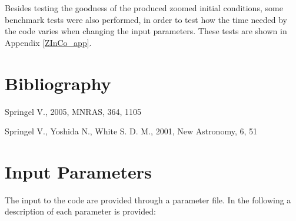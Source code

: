\documentclass[11pt,a4paper,titlepage]{article}
\begin{document}
Besides testing the goodness of the produced zoomed initial conditions, some benchmark tests were also performed, in order to test how the time needed by the code varies when changing the input parameters. These tests are shown in Appendix \ref{ZInCo_app}.

\section{Bibliography}
\begin{thebibliography}{99}
Springel V., 2005, MNRAS, 364, 1105

Springel V., Yoshida N., White S. D. M., 2001, New Astronomy, 6, 51
\end{thebibliography}


\appendix
\section{Input Parameters}
\label{Input_params}
The input to the code are provided through a parameter file. In the following a description of each parameter is provided:
\end{document}
